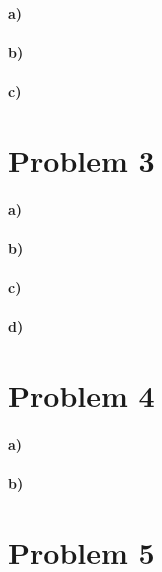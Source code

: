 \documentclass[12pt]{article}
\begin{document}
\paragraph{a)}



\paragraph{b)}

\paragraph{c)}

\section*{Problem 3}

\paragraph{a)}

\paragraph{b)}

\paragraph{c)}

\paragraph{d)}

\section*{Problem 4}

\paragraph{a)}

\paragraph{b)}

\section*{Problem 5}
\end{document}
